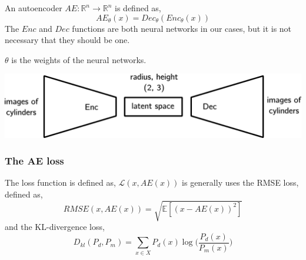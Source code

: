 \documentclass{beamer}
\begin{document}
\begin{frame}
	\begin{definition}
		An autoencoder $AE:\mathbb{R}^n\to\mathbb{R}^n$ is defined as,
		\begin{equation}
			AE_\theta(x) = Dec_\theta(Enc_\theta(x))
		\end{equation}
		The $Enc$ and $Dec$ functions are both neural networks in our cases,
		but it is not necessary that they should be one.

		$\theta$ is the weights of the neural networks.
	\end{definition}
	\begin{center}
	\includegraphics[width=.75\linewidth]{./encdec.png}
	\end{center}
\end{frame}

\begin{frame}
	\frametitle{The AE loss}
	The loss function is defined as, $\mathcal{L}(x,AE(x))$ is generally uses
	the RMSE loss, defined as,
	\begin{equation}
		RMSE(x,AE(x)) = \sqrt{\mathbb E[(x-AE(x))^2]}
	\end{equation}
	and the KL-divergence loss, 
	\begin{equation}
		D_{kl}(P_d,P_m) = \sum_{x\in X} P_d(x)\log\bigg(\frac{P_d(x)}{P_m(x)}\bigg)
	\end{equation}
\end{frame}
\end{document}
